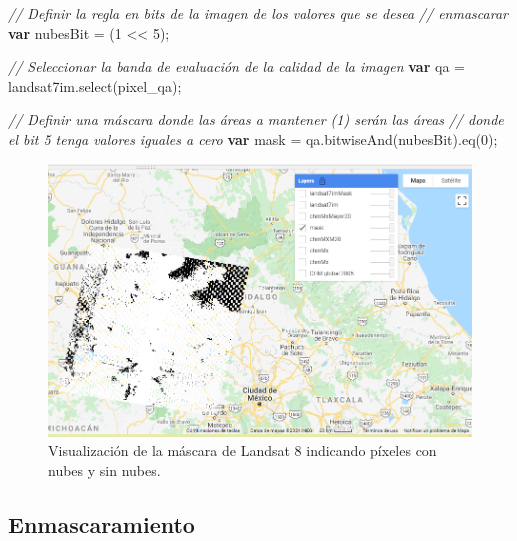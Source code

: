 \documentclass[
  12pt,
  letterpaper,
  twoside]{book}
\newenvironment{Shaded}{\begin{snugshade}}{\end{snugshade}}
\newcommand{\CommentTok}[1]{\textcolor[rgb]{0.24,0.58,0.00}{\textit{#1}}}
\newcommand{\ControlFlowTok}[1]{\textcolor[rgb]{0.00,0.00,0.00}{\textbf{#1}}}
\newcommand{\DecValTok}[1]{\textcolor[rgb]{0.28,0.53,0.93}{#1}}
\newcommand{\FunctionTok}[1]{\textcolor[rgb]{0.48,0.12,0.64}{#1}}
\newcommand{\NormalTok}[1]{#1}
\newcommand{\OperatorTok}[1]{\textcolor[rgb]{0.00,0.00,0.00}{#1}}
\newcommand{\StringTok}[1]{\textcolor[rgb]{0.87,0.29,0.22}{#1}}
\begin{document}
\begin{Shaded}
\begin{Highlighting}[]
\CommentTok{// Definir la regla en bits de la imagen de los valores que se desea }
\CommentTok{// enmascarar}
\ControlFlowTok{var}\NormalTok{ nubesBit }\OperatorTok{=}\NormalTok{ (}\DecValTok{1} \OperatorTok{\textless{}\textless{}} \DecValTok{5}\NormalTok{)}\OperatorTok{;}

\CommentTok{// Seleccionar la banda de evaluación de la calidad de la imagen}
\ControlFlowTok{var}\NormalTok{ qa }\OperatorTok{=}\NormalTok{ landsat7im}\OperatorTok{.}\FunctionTok{select}\NormalTok{(}\StringTok{\textquotesingle{}pixel\_qa\textquotesingle{}}\NormalTok{)}\OperatorTok{;}

\CommentTok{// Definir una máscara donde las áreas a mantener (1) serán las áreas }
\CommentTok{// donde el bit 5 tenga valores iguales a cero}
\ControlFlowTok{var}\NormalTok{ mask }\OperatorTok{=}\NormalTok{ qa}\OperatorTok{.}\FunctionTok{bitwiseAnd}\NormalTok{(nubesBit)}\OperatorTok{.}\FunctionTok{eq}\NormalTok{(}\DecValTok{0}\NormalTok{)}\OperatorTok{;}
\end{Highlighting}
\end{Shaded}

\begin{figure}[H]

{\centering \includegraphics[width=0.95\linewidth]{Img/ej278} 

}

\caption{Visualización de la máscara de Landsat 8 indicando píxeles con nubes y sin nubes.}\label{fig:unnamed-chunk-75}
\end{figure}

\hypertarget{enmascaramiento}{%
\subsection*{Enmascaramiento}\label{enmascaramiento}}
\end{document}
